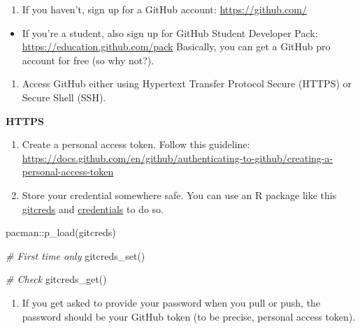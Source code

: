 \documentclass[
]{book}
\newenvironment{Shaded}{\begin{snugshade}}{\end{snugshade}}
\newcommand{\CommentTok}[1]{\textcolor[rgb]{0.56,0.35,0.01}{\textit{#1}}}
\newcommand{\FunctionTok}[1]{\textcolor[rgb]{0.00,0.00,0.00}{#1}}
\newcommand{\NormalTok}[1]{#1}
\newcommand{\SpecialCharTok}[1]{\textcolor[rgb]{0.00,0.00,0.00}{#1}}
\providecommand{\tightlist}{%
  \setlength{\itemsep}{0pt}\setlength{\parskip}{0pt}}
\begin{document}
\begin{enumerate}
\def\labelenumi{\arabic{enumi}.}
\setcounter{enumi}{1}
\tightlist
\item
  If you haven't, sign up for a GitHub account: \url{https://github.com/}
\end{enumerate}

\begin{itemize}
\tightlist
\item
  If you're a student, also sign up for GitHub Student Developer Pack: \url{https://education.github.com/pack} Basically, you can get a GitHub pro account for free (so why not?).
\end{itemize}

\begin{enumerate}
\def\labelenumi{\arabic{enumi}.}
\setcounter{enumi}{2}
\tightlist
\item
  Access GitHub either using Hypertext Transfer Protocol Secure (HTTPS) or Secure Shell (SSH).
\end{enumerate}

\textbf{HTTPS}

\begin{enumerate}
\def\labelenumi{\arabic{enumi}.}
\item
  Create a personal access token. Follow this guideline: \url{https://docs.github.com/en/github/authenticating-to-github/creating-a-personal-access-token}
\item
  Store your credential somewhere safe. You can use an R package like this \href{https://gitcreds.r-lib.org/}{gitcreds} and \href{https://docs.ropensci.org/credentials/}{credentials} to do so.
\end{enumerate}

\begin{Shaded}
\begin{Highlighting}[]
\NormalTok{pacman}\SpecialCharTok{::}\FunctionTok{p\_load}\NormalTok{(gitcreds)}

\CommentTok{\# First time only }
\FunctionTok{gitcreds\_set}\NormalTok{()}

\CommentTok{\# Check }
\FunctionTok{gitcreds\_get}\NormalTok{()}
\end{Highlighting}
\end{Shaded}

\begin{enumerate}
\def\labelenumi{\arabic{enumi}.}
\setcounter{enumi}{2}
\tightlist
\item
  If you get asked to provide your password when you pull or push, the password should be your GitHub token (to be precise, personal access token).
\end{enumerate}
\end{document}
